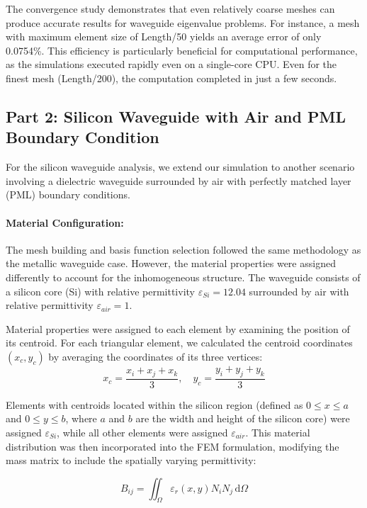 \documentclass[10pt,letterpaper]{article}
\begin{document}
The convergence study demonstrates that even relatively coarse meshes can produce accurate results for waveguide eigenvalue problems. For instance, a mesh with maximum element size of Length/50 yields an average error of only 0.0754\%. This efficiency is particularly beneficial for computational performance, as the simulations executed rapidly even on a single-core CPU. Even for the finest mesh (Length/200), the computation completed in just a few seconds.


\subsection*{Part 2: Silicon Waveguide with Air and PML Boundary Condition}
For the silicon waveguide analysis, we extend our simulation to another scenario involving a dielectric waveguide surrounded by air with perfectly matched layer (PML) boundary conditions. 
\paragraph{Material Configuration:} 
The mesh building and basis function selection followed the same methodology as the metallic waveguide case. However, the material properties were assigned differently to account for the inhomogeneous structure. The waveguide consists of a silicon core (Si) with relative permittivity $\varepsilon_{Si} = 12.04$ surrounded by air with relative permittivity $\varepsilon_{air} = 1$.

Material properties were assigned to each element by examining the position of its centroid. For each triangular element, we calculated the centroid coordinates $(x_c, y_c)$ by averaging the coordinates of its three vertices:
\begin{equation}
x_c = \frac{x_i + x_j + x_k}{3}, \quad y_c = \frac{y_i + y_j + y_k}{3}
\end{equation}

Elements with centroids located within the silicon region (defined as $0 \leq x \leq a$ and $0 \leq y \leq b$, where $a$ and $b$ are the width and height of the silicon core) were assigned $\varepsilon_{Si}$, while all other elements were assigned $\varepsilon_{air}$. This material distribution was then incorporated into the FEM formulation, modifying the mass matrix to include the spatially varying permittivity:

\begin{equation}
B_{ij} = \iint_{\Omega} \varepsilon_r(x,y) N_i N_j \, \mathrm{d}\Omega
\end{equation}
\end{document}
